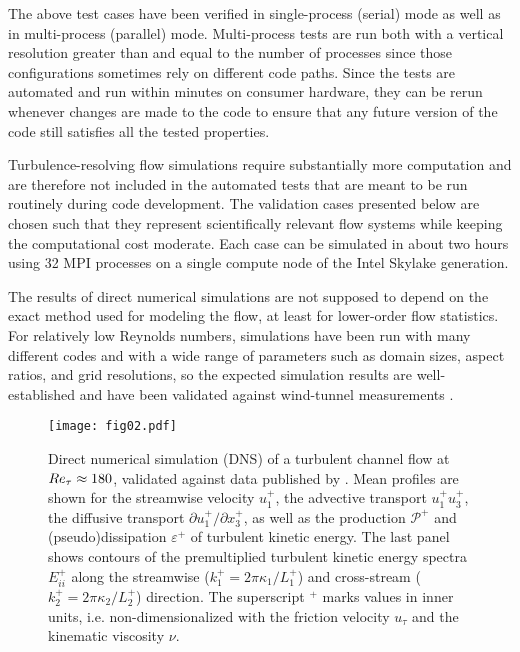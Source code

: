 \documentclass[gmd, manuscript]{copernicus}
\begin{document}
The above test cases have been verified in single-process (serial) mode as well as in multi-process (parallel) mode.
Multi-process tests are run both with a vertical resolution greater than and equal to the number of processes since those configurations sometimes rely on different code paths.
Since the tests are automated and run within minutes on consumer hardware, they can be rerun whenever changes are made to the code to ensure that any future version of the code still satisfies all the tested properties.

Turbulence-resolving flow simulations require substantially more computation and are therefore not included in the automated tests that are meant to be run routinely during code development.
The validation cases presented below are chosen such that they represent scientifically relevant flow systems while keeping the computational cost moderate.
Each case can be simulated in about two hours using 32 MPI processes on a single compute node of the Intel Skylake generation.

The results of direct numerical simulations are not supposed to depend on the exact method used for modeling the flow, at least for lower-order flow statistics.
For relatively low Reynolds numbers, simulations have been run with many different codes and with a wide range of parameters such as domain sizes, aspect ratios, and grid resolutions, so the expected simulation results are well-established and have been validated against wind-tunnel measurements \citep{KimMoinMoser1987, DelAlamoJimenez2003, LeeMoser2015}.

\begin{figure*}[!t]%
  \centering
  \texttt{[image: fig02.pdf]}
  \caption{
    Direct numerical simulation (DNS) of a turbulent channel flow at $R \mkern -.2mue_\tau\approx180$, validated against data published by \citet{LeeMoser2015}.
    Mean profiles are shown for the streamwise velocity $u_1^+$, the advective transport $u_1^+ u_3^+$, the diffusive transport $\partial u_1^+ / \partial x_3^+$, as well as the production $\mathcal{P}^+$ and (pseudo)dissipation $\varepsilon^+$ of turbulent kinetic energy.
    The last panel shows contours of the premultiplied turbulent kinetic energy spectra $E_{ii}^+$ along the streamwise ($k_1^+ = 2 \pi \kappa_1/L_1^+$) and cross-stream ($k_2^+ = 2 \pi \kappa_2/L_2^+$) direction.
    The superscript ${}^+$ marks values in inner units, i.e. non-dimensionalized with the friction velocity $u_\tau$ and the kinematic viscosity $\nu$.
  }\label{fig:validation-dns}
\end{figure*}
\end{document}
